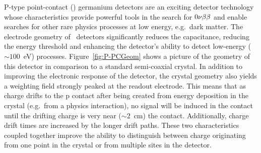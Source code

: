   P-type point-contact (\ppc) germanium detectors are an exciting detector
technology whose characteristics provide powerful tools in the search for
$0 \nu \beta \beta$ and enable searches for other rare physics processes at low energy, e.g.~dark matter.  
The electrode geometry of \ppc~detectors significantly reduces the
capacitance, reducing the energy threshold and enhancing the detector's
ability to detect low-energy ($\sim100$~eV) processes.  Figure~\ref{fig:P-PCGeom} shows a picture of the geometry of this detector in comparison to a standard semi-coaxial crystal.  In addition to improving the electronic response of the detector, the crystal geometry also yields a weighting field strongly peaked at the readout electrode.  This means that as charge drifts to the p contact after being created from energy deposition in the crystal (e.g.~from a physics interaction), no signal will be induced in the contact until the drifting charge is very near ($\sim2$~cm) the contact.  Additionally, charge drift times are increased by the longer drift paths.  These two characteristics coupled together improve the ability to distinguish between charge originating from one point in the crystal or from multiple sites in the detector.

